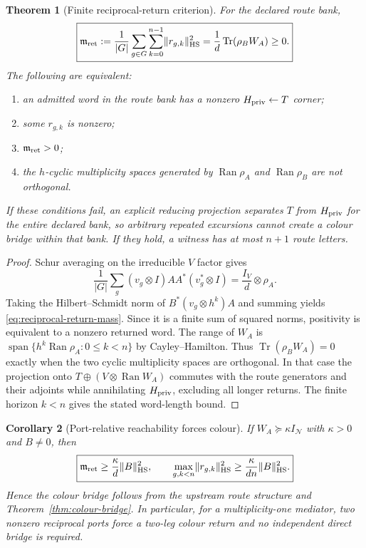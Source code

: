 \documentclass[11pt]{article}
\newtheorem{theorem}{Theorem}[section]
\newtheorem{corollary}[theorem]{Corollary}
\theoremstyle{definition}
\theoremstyle{remark}
\newcommand{\Tr}{\operatorname{Tr}}
\newcommand{\Ran}{\operatorname{Ran}}
\newcommand{\Span}{\operatorname{span}}
\newcommand{\HS}{\mathrm{HS}}
\newcommand{\norm}[1]{\lVert#1\rVert}
\begin{document}
\begin{theorem}[Finite reciprocal-return criterion]
\label{thm:reciprocal-return}
For the declared route bank,
\begin{equation}
 \boxed{
 \mathfrak m_{\rm ret}
 :=\frac1{|G|}\sum_{g\in G}\sum_{k=0}^{n-1}
       \norm{r_{g,k}}_{\HS}^2
 =\frac1d\Tr(\rho_BW_A)\ge0.}
 \label{eq:reciprocal-return-mass}
\end{equation}
The following are equivalent:
\begin{enumerate}[label=\textup{(\roman*)},leftmargin=2.8em]
\item an admitted word in the route bank has a nonzero
      $H_{\rm priv}\leftarrow T$ corner;
\item some $r_{g,k}$ is nonzero;
\item $\mathfrak m_{\rm ret}>0$;
\item the $h$-cyclic multiplicity spaces generated by $\Ran\rho_A$ and
      $\Ran\rho_B$ are not orthogonal.
\end{enumerate}
If these conditions fail, an explicit reducing projection separates $T$ from
$H_{\rm priv}$ for the entire declared bank, so arbitrary repeated excursions
cannot create a colour bridge within that bank.  If they hold, a witness has
at most $n+1$ route letters.
\end{theorem}

\begin{proof}
Schur averaging on the irreducible $V$ factor gives
\[
 \frac1{|G|}\sum_g
 (v_g\otimes I)AA^*(v_g^*\otimes I)
 =\frac{I_V}{d}\otimes\rho_A.
\]
Taking the Hilbert--Schmidt norm of $B^*(v_g\otimes h^k)A$ and summing yields
\eqref{eq:reciprocal-return-mass}.  Since it is a finite sum of squared norms,
positivity is equivalent to a nonzero returned word.  The range of $W_A$ is
$\Span\{h^k\Ran\rho_A:0\le k<n\}$ by Cayley--Hamilton.  Thus
$\Tr(\rho_BW_A)=0$ exactly when the two cyclic multiplicity spaces are
orthogonal.  In that case the projection onto
$T\oplus(V\otimes\Ran W_A)$ commutes with the route generators and their
adjoints while annihilating $H_{\rm priv}$, excluding all longer returns.  The
finite horizon $k<n$ gives the stated word-length bound.
\end{proof}

\begin{corollary}[Port-relative reachability forces colour]
\label{cor:reciprocal-return-force}
If $W_A\succeq\kappa I_{\mathcal N}$ with $\kappa>0$ and $B\ne0$, then
\begin{equation}
 \boxed{
 \mathfrak m_{\rm ret}\ge\frac{\kappa}{d}\norm B_{\HS}^2,
 \qquad
 \max_{g,k<n}\norm{r_{g,k}}_{\HS}^2
 \ge\frac{\kappa}{dn}\norm B_{\HS}^2.}
 \label{eq:reciprocal-return-margin}
\end{equation}
Hence the colour bridge follows from the upstream route structure and
Theorem~\ref{thm:colour-bridge}.  In particular, for a multiplicity-one
mediator, two nonzero reciprocal ports force a two-leg colour return and no
independent direct bridge is required.
\end{corollary}
\end{document}

